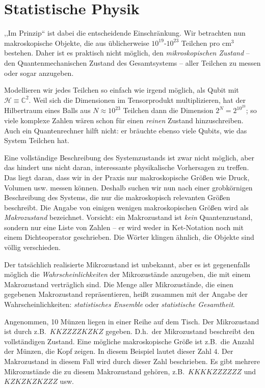 \section*{Statistische Physik}
,,Im Prinzip`` ist dabei die entscheidende Einschränkung. Wir betrachten nun makroskopische Objekte, die aus üblicherweise $10^{19}$-$10^{23}$ Teilchen pro $\text{cm}^3$ bestehen. Daher ist es praktisch nicht möglich, den \emph{mikroskopischen Zustand} -- den Quantenmechanischen Zustand des Gesamtsystems -- aller Teilchen zu messen oder sogar anzugeben. 

\begin{greybox}
Modellieren wir jedes Teilchen so einfach wie irgend möglich, als Qubit mit $\mathcal{H}\equiv \mathbb{C}^2$. Weil sich die Dimensionen im Tensorprodukt multiplizieren, hat der Hilbertraum eines Balls aus $N\approx 10^{23}$ Teilchen dann die Dimension $2^N = 2^{10^{23}}$; so viele komplexe Zahlen wären schon für einen \emph{reinen} Zustand hinzuschreiben. Auch ein Quantenrechner hilft nicht: er bräuchte ebenso viele Qubits, wie das System Teilchen hat.
\end{greybox}

Eine vollständige Beschreibung des Systemzustands ist zwar nicht möglich, aber das hindert uns nicht daran, interessante physikalische Vorhersagen zu treffen. Das liegt daran, dass wir in der Praxis nur makroskopische Größen wie Druck, Volumen usw. messen können. Deshalb suchen wir nun nach einer grobkörnigen Beschreibung des Systems, die nur die makroskopisch relevanten Größen beschreibt. Die Angabe von einigen wenigen makroskopischen Größen wird als \emph{Makrozustand} bezeichnet. Vorsicht: ein Makrozustand ist \emph{kein} Quantenzustand, sondern nur eine Liste von Zahlen -- er wird weder in Ket-Notation noch mit einem Dichteoperator geschrieben. Die Wörter klingen ähnlich, die Objekte sind völlig verschieden.

Der tatsächlich realisierte Mikrozustand ist unbekannt, aber es ist gegenenfalls möglich die \emph{Wahrscheinlichkeiten} der Mikrozustände anzugeben, die mit einem Makrozustand verträglich sind. Die Menge aller Mikrozustände, die einen gegebenen Makrozustand repräsentieren, heißt zusammen mit der Angabe der Wahrscheinlichkeiten: \emph{statistisches Ensemble} oder \emph{statistische Gesamtheit}.

\begin{beispiel}
  Angenommen, 10 Münzen liegen in einer Reihe auf dem Tisch. Der Mikrozustand ist durch z.B.\ $KKZZZZKZKZ$ gegeben. D.h.\ der Mikrozustand beschreibt den vollständigen Zustand. Eine mögliche makroskopische Größe ist z.B.\ die Anzahl der Münzen, die Kopf zeigen. In diesem Beispiel lautet dieser Zahl $4$. Der Makrozustand in diesem Fall wird durch dieser Zahl beschrieben. Es gibt mehrere Mikrozustände die zu diesem Makrozustand gehören, z.B.\ $KKKKZZZZZZ$ und $KZKZKZKZZZ$ usw.
\end{beispiel}

